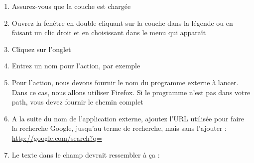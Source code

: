 \begin{enumerate}
\item Assurez-vous que la couche  est chargée
\item Ouvrez la fenêtre  en double cliquant sur la couche dans la légende ou en faisant un clic droit et en choisissant  dans le menu qui apparaît
\item Cliquez sur l'onglet 
\item Entrez un nom pour l'action, par exemple 
\item Pour l'action, nous devons fournir le nom du programme externe à lancer. Dans ce cas, nous allons utiliser Firefox. Si le programme n'est pas dans votre path, vous devez fournir le chemin complet
\item A la suite du nom de l'application externe, ajoutez l'URL utilisée pour faire la recherche Google, jusqu'au terme de recherche, mais sans l'ajouter :\\ \url{http://google.com/search?q=}
\item Le texte dans le champ  devrait ressembler à ça :\\

\end{enumerate}
